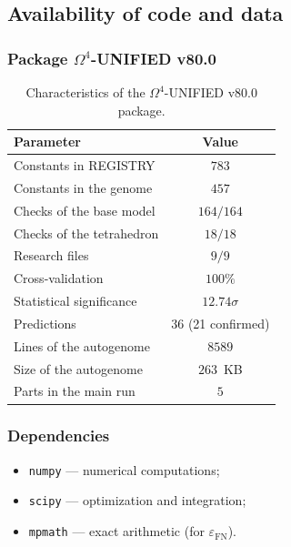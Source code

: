 \documentclass[11pt,a4paper]{article}
\newcommand{\Om}{\ensuremath{\Omega^4}}
\theoremstyle{definition}
\begin{document}
\subsection{Availability of code and data}
\label{subsec:conclusions-availability}

\subsubsection{Package \texorpdfstring{$\Om$}{}-UNIFIED v80.0}

\begin{table}[ht]
\centering
\caption{Characteristics of the \texorpdfstring{$\Om$}{}-UNIFIED v80.0 package.}
\label{tab:conclusions-package}
\begin{tabular}{lc}
\toprule
Parameter & Value \\
\midrule
Constants in REGISTRY & $783$ \\
Constants in the genome & $457$ \\
Checks of the base model & $164/164$ \\
Checks of the tetrahedron & $18/18$ \\
Research files & $9/9$ \\
Cross-validation & $100\%$ \\
Statistical significance & $12.74\sigma$ \\
Predictions & $36$ (21 confirmed) \\
Lines of the autogenome & $8589$ \\
Size of the autogenome & $263$~KB \\
Parts in the main run & $5$ \\
\bottomrule
\end{tabular}
\end{table}

\subsubsection{Dependencies}

\begin{itemize}
    \item \texttt{numpy} --- numerical computations;
    \item \texttt{scipy} --- optimization and integration;
    \item \texttt{mpmath} --- exact arithmetic (for $\varepsilon_{\text{FN}}$).
\end{itemize}
\end{document}
